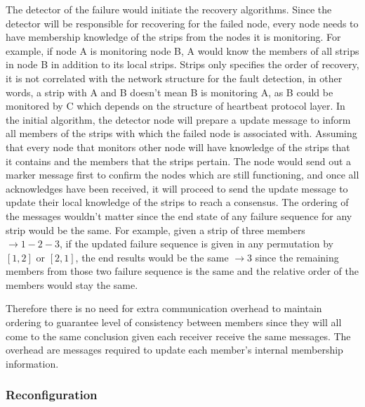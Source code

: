 The detector of the failure would initiate the recovery algorithms.
Since the detector will be responsible for recovering for the failed node,
every node needs to have membership knowledge of the strips from the nodes it
is monitoring. For example, if node A is monitoring node B, A would know the
members of all strips in node B in addition to its local strips. Strips only
specifies the order of recovery, it is not correlated with the network
structure for the fault detection, in other words, a strip with A and B doesn't
mean B is monitoring A, as B could be monitored by C which depends on the
structure of heartbeat protocol layer.
In the initial algorithm, the detector node will prepare a update message to
inform all members of the strips with which the failed node is associated with.
Assuming that every node that monitors other node will have knowledge of the
strips that it contains and the members that the strips pertain. The node would
send out a marker message first to confirm the nodes which are still
functioning, and once all acknowledges have been received, it will proceed to
send the update message to update their local knowledge of the strips to reach
a consensus. The ordering of the messages wouldn't matter since the end state
of any failure sequence for any strip would be the same. For example, given
a strip of three members $\rightarrow 1-2-3$, if the updated failure sequence
is given in any permutation by $[1, 2]$ or $[2, 1]$, the end results would be
the same $\rightarrow 3$ since the remaining members from those two failure
sequence is the same and the relative order of the members would stay the same.

Therefore there is no need for extra communication overhead to maintain
ordering to guarantee level of consistency between members since they will all
come to the same conclusion given each receiver receive the same messages. The
overhead are messages required to update each member's internal membership
information.


\subsubsection{Reconfiguration}
\label{s:reconfig}


